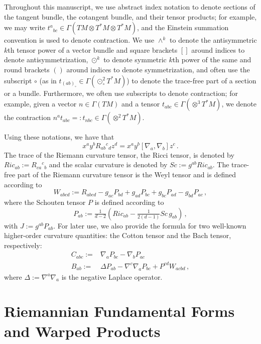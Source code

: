 \documentclass[a4paper,10.9pt]{amsart}
\theoremstyle{definition}
\theoremstyle{remark}
\numberwithin{equation}{section}
\renewcommand{\=}{\stackrel \Sigma =}
\begin{document}
Throughout this manuscript, we use abstract index notation to denote sections of the tangent bundle, the cotangent bundle, and their tensor products; for example, we may write $t^a{}_{bc} \in \Gamma(TM \otimes T^* M \otimes T^* M)$, and the Einstein summation convention is used to denote contraction. We use $\wedge^k$ to denote the antisymmetric $k$th tensor power of a vector bundle and square brackets $[]$ around indices to denote antisymmetrization, $\odot^k$ to denote symmetric $k$th power of the same and round brackets $()$ around indices to denote symmetrization, and often use the subscript $\circ$ (as in $t_{(ab)_{\circ}} \in \Gamma(\odot^2_{\circ} T^* M)$) to denote the trace-free part of a section or a bundle. Furthermore, we often use subscripts to denote contraction; for example, given a vector $n \in \Gamma(TM)$ and a tensor $t_{abc} \in \Gamma(\otimes^3 T^* M)$, we denote the contraction $n^a t_{abc} =: t_{nbc} \in \Gamma(\otimes^2 T^* M)$.

Using these notations, we have that
$$x^a y^b R_{ab}{}^c{}_d z^d =x^a y^b [\nabla_a, \nabla_b] z^c\,.$$
The trace of the Riemann curvature tensor, the Ricci tensor, is denoted by $Ric_{ab} := R_{ca}{}^c{}_b$ and the scalar curvature is denoted by $Sc := g^{ab} Ric_{ab}$. The trace-free part of the Riemann curvature tensor is the Weyl tensor and is defined according to
$$W_{abcd} := R_{abcd} - g_{ac} P_{bd} + g_{ad} P_{bc} + g_{bc} P_{ad} - g_{bd} P_{ac}\,,$$
where the Schouten tensor $P$ is defined according to
$$P_{ab} := \tfrac{1}{d-2} \left(Ric_{ab} - \tfrac{1}{2(d-1)} Sc \, g_{ab} \right)\,,$$
with $J := g^{ab} P_{ab}$.
For later use, we also provide the formula for two well-known higher-order curvature quantities: the Cotton tensor and the Bach tensor, respectively:
\begin{align*}
C_{abc} :=& \nabla_a P_{bc} - \nabla_b P_{ac} \\
B_{ab} :=& \Delta P_{ab} - \nabla^c \nabla_a P_{bc} + P^{cd} W_{acbd}\,,
\end{align*}
where $\Delta :=\nabla^a \nabla_a $ is the negative Laplace operator.

\section{Riemannian Fundamental Forms and Warped Products} \label{sec:riem}
\end{document}
